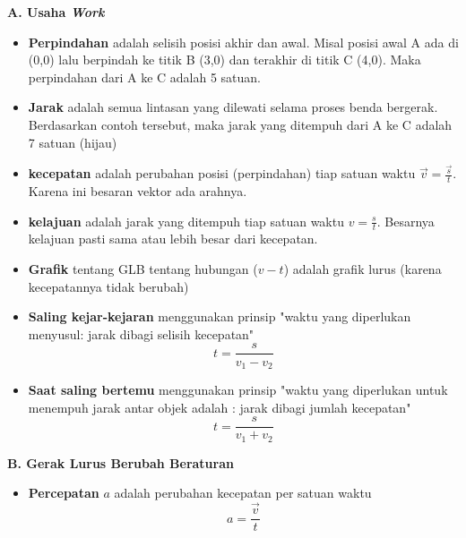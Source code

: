 \documentclass[10pt,a4paper]{article}
\begin{document}
\begin{multicols*}{2}
\begin{catatan}\textbf{A. Usaha \textit{Work}}\end{catatan}
\begin{itemize}[itemsep=0mm,topsep=0mm,leftmargin=*]
\item \textbf{Perpindahan} adalah selisih posisi akhir dan awal. Misal posisi awal A ada di (0,0) lalu berpindah ke titik B (3,0) dan terakhir di titik C (4,0). Maka perpindahan dari A ke C adalah 5 satuan.
\item \textbf{Jarak} adalah semua lintasan yang dilewati selama proses benda bergerak. Berdasarkan contoh tersebut, maka jarak yang ditempuh dari A ke C adalah 7 satuan (hijau)

\item \textbf{kecepatan} adalah perubahan posisi (perpindahan) tiap satuan waktu $\vec{v} = \frac{\vec{s}}{t} $. Karena ini besaran vektor ada arahnya.
\item \textbf{kelajuan} adalah jarak yang ditempuh tiap satuan waktu $v =\frac{s}{t}$. Besarnya kelajuan pasti sama atau lebih besar dari kecepatan.

\item \textbf{Grafik} tentang GLB tentang hubungan ($v-t$) adalah grafik lurus (karena kecepatannya tidak berubah)

\item \textbf{Saling kejar-kejaran} menggunakan prinsip "waktu yang diperlukan menyusul: jarak dibagi selisih kecepatan" $$ t = \frac{s}{v_1-v_2}$$

\item \textbf{Saat saling bertemu} menggunakan prinsip "waktu yang diperlukan untuk menempuh jarak antar objek adalah : jarak dibagi jumlah kecepatan" $$ t = \frac{s}{v_1+v_2}$$ 

\end{itemize}

\begin{catatan}
\textbf{B. Gerak Lurus Berubah Beraturan}
\end{catatan}
\begin{itemize}[itemsep=0mm,topsep=0mm,leftmargin=*]
\item \textbf{Percepatan} $a$ adalah perubahan kecepatan per satuan waktu $$a = \frac{\vec{v}}{t}$$


\end{itemize}
\end{multicols*}
\end{document}
